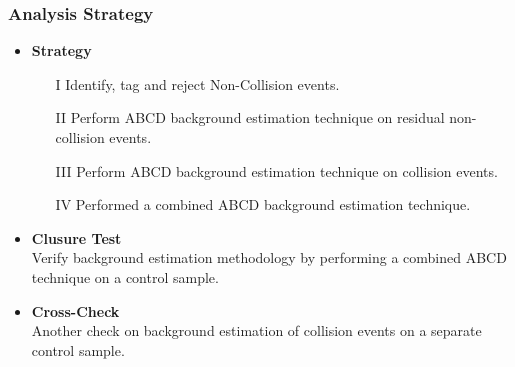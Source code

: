 \documentclass{beamer}
\begin{document}
\begin{frame}
\frametitle{Analysis Strategy}
\begin{itemize}
 \item \textcolor{UMN@Maroon}{\textbf{Strategy}}
   \begin{enumerate}
    \item[I] Identify, tag and reject Non-Collision events.
    \item[II] Perform ABCD background estimation technique on residual non-collision events.
    \item[III]Perform ABCD background estimation technique on collision events.
    \item[IV] Performed a combined ABCD background estimation technique. 
    \end{enumerate}
 \item \textcolor{UMN@Maroon}{\textbf{Clusure Test}}\\
 Verify background estimation methodology by performing a combined ABCD technique on a control sample.
 \item \textcolor{UMN@Maroon}{\textbf{Cross-Check}}\\
 Another check on background estimation of collision events on a separate control sample.
\end{itemize}  
\end{frame}
\end{document}
